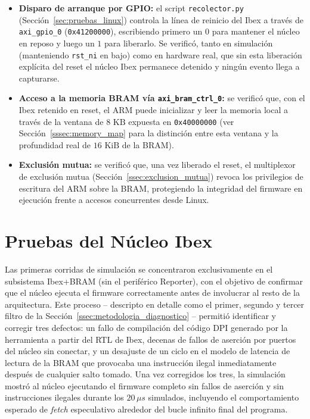 \begin{itemize}
    \item \textbf{Disparo de arranque por GPIO:} el script
    \texttt{recolector.py} (Sección~\ref{sec:pruebas_linux}) controla la
    línea de reinicio del Ibex a través de \texttt{axi\_gpio\_0}
    (\texttt{0x41200000}), escribiendo primero un $0$ para mantener el
    núcleo en reposo y luego un $1$ para liberarlo. Se verificó, tanto en
    simulación (manteniendo \texttt{rst\_ni} en bajo) como en hardware
    real, que sin esta liberación explícita del reset el núcleo Ibex
    permanece detenido y ningún evento llega a capturarse.
    \item \textbf{Acceso a la memoria BRAM vía
    \texttt{axi\_bram\_ctrl\_0}:} se verificó que, con el Ibex retenido en
    reset, el ARM puede inicializar y leer la memoria local a través de la
    ventana de $8\text{ KB}$ expuesta en \texttt{0x40000000} (ver
    Sección~\ref{sssec:memory_map} para la distinción entre esta ventana y
    la profundidad real de $16\text{ KiB}$ de la BRAM).
    \item \textbf{Exclusión mutua:} se verificó que, una vez liberado el
    reset, el multiplexor de exclusión mutua
    (Sección~\ref{ssec:exclusion_mutua}) revoca los privilegios de
    escritura del ARM sobre la BRAM, protegiendo la integridad del
    firmware en ejecución frente a accesos concurrentes desde Linux.
\end{itemize}


\section{Pruebas del Núcleo Ibex}
\label{sec:pruebas_ibex}

Las primeras corridas de simulación se concentraron exclusivamente en el
subsistema Ibex+BRAM (sin el periférico Reporter), con el objetivo de
confirmar que el núcleo ejecuta el firmware correctamente antes de
involucrar al resto de la arquitectura. Este proceso -- descripto en
detalle como el primer, segundo y tercer filtro de la
Sección~\ref{ssec:metodologia_diagnostico} -- permitió identificar y
corregir tres defectos: un fallo de compilación del código DPI generado
por la herramienta a partir del RTL de Ibex, decenas de fallos de
aserción por puertos del núcleo sin conectar, y un desajuste de un ciclo
en el modelo de latencia de lectura de la BRAM que provocaba una
instrucción ilegal inmediatamente después de cualquier salto tomado. Una
vez corregidos los tres, la simulación mostró al núcleo ejecutando el
firmware completo sin fallos de aserción y sin instrucciones ilegales
durante los $20\,\mu s$ simulados, incluyendo el comportamiento esperado
de \textit{fetch} especulativo alrededor del bucle infinito final del
programa.

